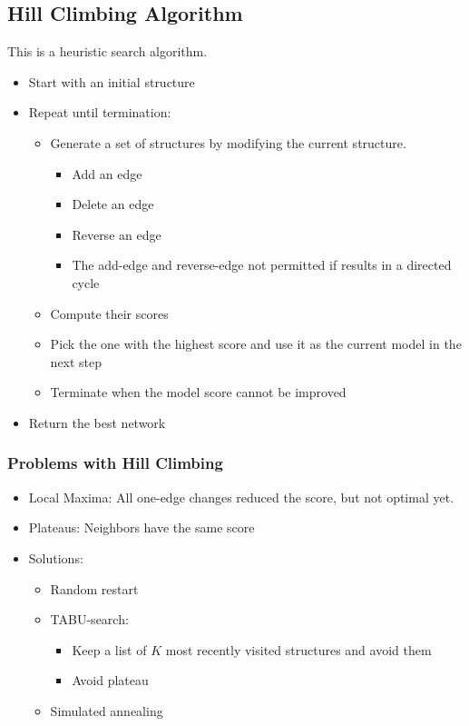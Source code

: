 \documentclass[10pt]{article}
\begin{document}
\subsection*{Hill Climbing Algorithm}
This is a heuristic search algorithm.
\begin{itemize}
	\item Start with an initial structure
	\item Repeat until termination:
	\begin{itemize}
	    \item Generate a set of structures by modifying the current structure.
	    \begin{itemize}
	        \item Add an edge
	        \item Delete an edge
	        \item Reverse an  edge
	        \item The add-edge and reverse-edge not permitted if results in a directed cycle
        \end{itemize}
        \item Compute their scores
        \item Pick the one with the highest score and use it as the current model in the next step
        \item Terminate when the model score cannot be improved
    \end{itemize}
    \item Return the best network
\end{itemize}

\subsubsection*{Problems with Hill Climbing}
\begin{itemize}
	\item Local Maxima: All one-edge changes reduced the score, but not optimal yet.
	\item Plateaus: Neighbors have the same score
	\item Solutions:
	\begin{itemize}
	    \item Random restart
	    \item TABU-search:
	    \begin{itemize}
	        \item Keep a list of $K$ most recently visited structures and avoid them
	        \item Avoid plateau
        \end{itemize}
        \item Simulated annealing
    \end{itemize}
\end{itemize}
\end{document}
